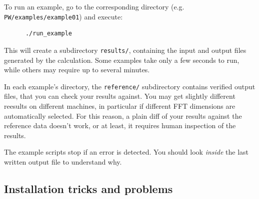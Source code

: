 \documentclass[12pt,a4paper]{article}
\begin{document}
To run an example, go to the corresponding directory (e.g.
 \texttt{PW/examples/example01}) and execute:
\begin{verbatim}
      ./run_example
\end{verbatim}
This will create a subdirectory \texttt{results/}, containing the input and
output files generated by the calculation. Some examples take only a
few seconds to run, while others may require up to several minutes.

In each example's directory, the \texttt{reference/} subdirectory contains
verified output files, that you can check your results against. You may
get slightly different reesults on different machines, in particular if
different FFT dimensions are automatically selected. For this reason, a
plain diff of your results against the reference data doesn't work, or
at least, it requires human inspection of the results.

The example scripts stop if an error is detected. You should look {\em inside}
the last written output file to understand why.

\subsection{Installation tricks and problems}
\end{document}
